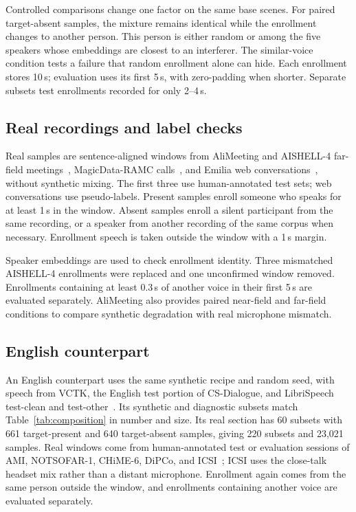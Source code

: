 Controlled comparisons change one factor on the same base scenes.
For paired target-absent samples, the mixture remains identical while the enrollment changes to another person.
This person is either random or among the five speakers whose embeddings are closest to an interferer.
The similar-voice condition tests a failure that random enrollment alone can hide.
Each enrollment stores 10\,s; evaluation uses its first 5\,s, with zero-padding when shorter.
Separate subsets test enrollments recorded for only 2--4\,s.

\subsection{Real recordings and label checks}
Real samples are sentence-aligned windows from AliMeeting and AISHELL-4 far-field meetings~\cite{yu2022m2met,fu2021aishell4}, MagicData-RAMC calls~\cite{yang2022open}, and Emilia web conversations~\cite{he2024emilia}, without synthetic mixing.
The first three use human-annotated test sets; web conversations use pseudo-labels.
Present samples enroll someone who speaks for at least 1\,s in the window.
Absent samples enroll a silent participant from the same recording, or a speaker from another recording of the same corpus when necessary.
Enrollment speech is taken outside the window with a 1\,s margin.

Speaker embeddings are used to check enrollment identity.
Three mismatched AISHELL-4 enrollments were replaced and one unconfirmed window removed.
Enrollments containing at least 0.3\,s of another voice in their first 5\,s are evaluated separately.
AliMeeting also provides paired near-field and far-field conditions to compare synthetic degradation with real microphone mismatch.

\subsection{English counterpart}
An English counterpart uses the same synthetic recipe and random seed, with speech from VCTK, the English test portion of CS-Dialogue, and LibriSpeech test-clean and test-other~\cite{yamagishi2019cstr,zhou2025csdialogue,panayotov2015librispeech}.
Its synthetic and diagnostic subsets match Table~\ref{tab:composition} in number and size.
Its real section has 60 subsets with 661 target-present and 640 target-absent samples, giving 220 subsets and 23{,}021 samples.
Real windows come from human-annotated test or evaluation sessions of AMI, NOTSOFAR-1, CHiME-6, DiPCo, and ICSI~\cite{carletta2005ami,vinnikov2024notsofar,watanabe2020chime6,vansegbroeck2019dipco,janin2003icsi}; ICSI uses the close-talk headset mix rather than a distant microphone.
Enrollment again comes from the same person outside the window, and enrollments containing another voice are evaluated separately.

